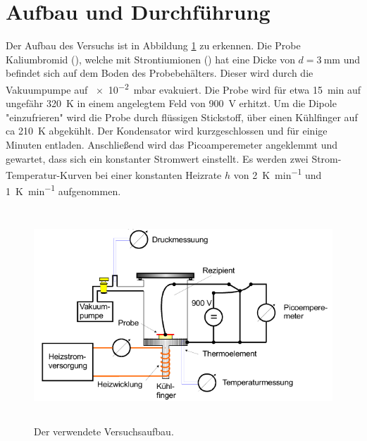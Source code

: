 \newpage
\section{Aufbau und Durchführung}
\label{sec:Durchführung}
Der Aufbau des Versuchs ist in Abbildung \ref{fig:Versuch} zu erkennen.
Die Probe Kaliumbromid (), welche mit Strontiumionen () hat eine Dicke von $d=\SI{3}{\milli\meter}$ und befindet sich auf dem Boden des Probebehälters.
Dieser wird durch die Vakuumpumpe auf \SI{e-2}{\milli\bar} evakuiert.
Die Probe wird für etwa \SI{15}{\minute} auf ungefähr \SI{320}{\kelvin} in einem angelegtem Feld von \SI{900}{\volt} erhitzt.
Um die Dipole "einzufrieren" wird die Probe durch flüssigen Stickstoff, über einen Kühlfinger auf ca \SI{210}{\kelvin} abgekühlt.
Der Kondensator wird kurzgeschlossen und für einige Minuten entladen.
Anschließend wird das Picoamperemeter angeklemmt und gewartet, dass sich ein konstanter Stromwert einstellt.
Es werden zwei Strom-Temperatur-Kurven bei einer konstanten Heizrate $h$ von \SI{2}{\kelvin\per\minute} und \SI{1}{\kelvin\per\minute} aufgenommen.
\begin{figure}[htb]
    \centering
    \includegraphics[height=8cm]{pics/Versuch.png}
    \caption{Der verwendete Versuchsaufbau. \cite{anleitung}}
    \label{fig:Versuch}
  \end{figure}
  \FloatBarrier
